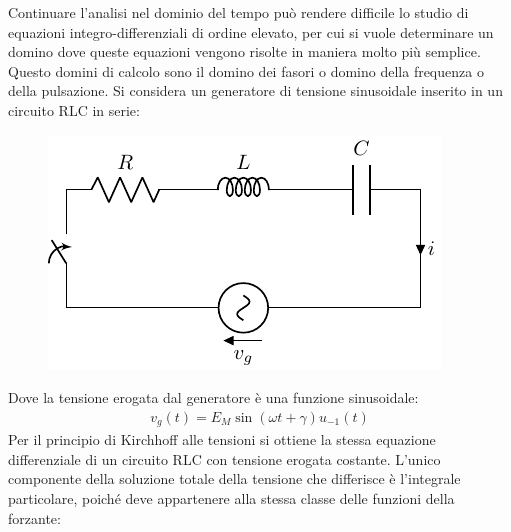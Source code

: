 \documentclass{article}
\numberwithin{equation}{subsection}
\begin{document}
Continuare l'analisi nel dominio del tempo può rendere difficile lo studio di equazioni integro-differenziali di ordine elevato, per cui si vuole determinare un domino dove 
queste equazioni vengono risolte in maniera molto più semplice. Questo domini di calcolo sono il domino dei fasori o domino della frequenza o della pulsazione. Si considera 
un generatore di tensione sinusoidale inserito in un circuito RLC in serie:
\begin{figure}[H]%
    \centering
    \includegraphics{circuito-rlc-serie-sinsusoide.pdf}%
    \label{fig:circuito-rlc-serie-sinusoide}
\end{figure}
Dove la tensione erogata dal generatore è una funzione sinusoidale:
\begin{gather*}
    v_g(t)=E_M\sin(\omega t+\gamma)u_{-1}(t)
\end{gather*}
Per il principio di Kirchhoff alle tensioni si ottiene la stessa equazione differenziale di un circuito RLC con tensione erogata costante. L'unico componente della soluzione 
totale della tensione che differisce è l'integrale particolare, poiché deve appartenere alla stessa classe delle funzioni della forzante:
\end{document}
